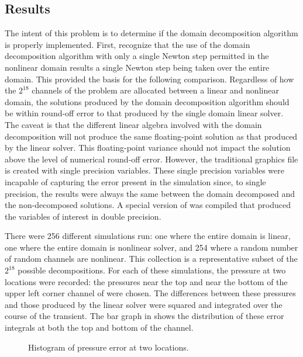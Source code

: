 \subsection{Results}
\label{sect:complexResults}

The intent of this problem is to determine if the domain decomposition algorithm is properly implemented.
First, recognize that the use of the domain decomposition algorithm with only a single Newton step permitted in the nonlinear domain results a single Newton step being taken over the entire domain.
This provided the basis for the following comparison.
Regardless of how the $2^{18}$ channels of the problem are allocated between a linear and nonlinear domain, the solutions produced by the domain decomposition algorithm should be within round-off error to that produced by the single domain linear solver.
The caveat is that the different linear algebra involved with the domain decomposition will not produce the same floating-point solution as that produced by the linear solver.
This floating-point variance should not impact the solution above the level of numerical round-off error.
However, the traditional \cobra{} graphics file is created with single precision variables.
These single precision variables were incapable of capturing the error present in the simulation since, to single precision, the results were always the same between the domain decomposed and the non-decomposed solutions.
A special version of \cobra{} was compiled that produced the variables of interest in double precision.

There were 256 different simulations run: one where the entire domain is linear, one where the entire domain is nonlinear solver, and 254 where a random number of random channels are nonlinear.
This collection is a representative subset of the $2^{18}$ possible decompositions.
For each of these simulations, the pressure at two locations were recorded: the pressures near the top and near the bottom of the upper left corner channel of  were chosen.
The differences between these pressures and those produced by the linear solver were squared and integrated over the course of the transient.
The bar graph in  shows the distribution of these error integrals at both the top and bottom of the channel.

\begin{figure}[h!tb]
\centering

\caption{Histogram of pressure error at two locations.}
\label{fig:complexBar}
\end{figure}

